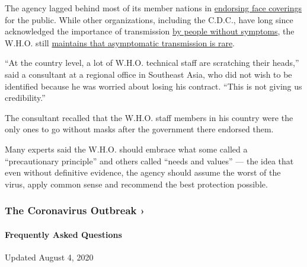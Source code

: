 The agency lagged behind most of its member nations in
\href{https://www.nytimes.com/2020/06/05/health/coronavirus-masks-who.html}{endorsing
face coverings} for the public. While other organizations, including the
C.D.C., have long since acknowledged the importance of transmission
\href{https://www.nytimes.com/2020/06/27/world/europe/coronavirus-spread-asymptomatic.html}{by
people without symptoms}, the W.H.O. still
\href{https://www.nytimes.com/2020/06/09/health/coronavirus-asymptomatic-world-health-organization.html}{maintains
that asymptomatic transmission is rare}.

``At the country level, a lot of W.H.O. technical staff are scratching
their heads,'' said a consultant at a regional office in Southeast Asia,
who did not wish to be identified because he was worried about losing
his contract. ``This is not giving us credibility.''

The consultant recalled that the W.H.O. staff members in his country
were the only ones to go without masks after the government there
endorsed them.

Many experts said the W.H.O. should embrace what some called a
``precautionary principle'' and others called ``needs and values'' ---
the idea that even without definitive evidence, the agency should assume
the worst of the virus, apply common sense and recommend the best
protection possible.

\href{https://www.nytimes.com/news-event/coronavirus?action=click\&pgtype=Article\&state=default\&region=MAIN_CONTENT_3\&context=storylines_faq}{}

\hypertarget{the-coronavirus-outbreak-}{%
\subsubsection{The Coronavirus Outbreak
›}\label{the-coronavirus-outbreak-}}

\hypertarget{frequently-asked-questions}{%
\paragraph{Frequently Asked
Questions}\label{frequently-asked-questions}}

Updated August 4, 2020

